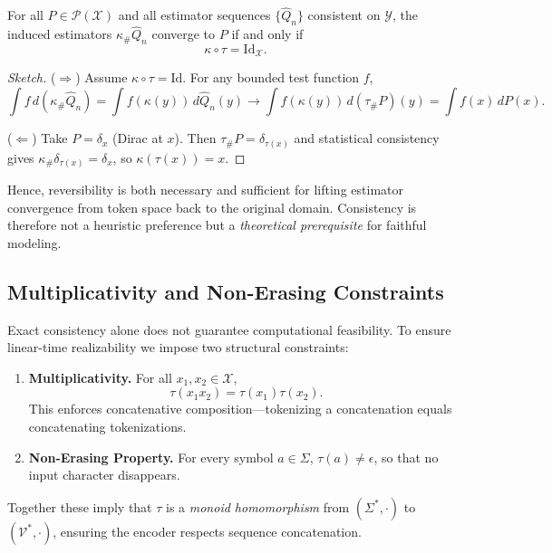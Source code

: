 \begin{theorem}
\label{thm:consistency}
For all $P\in\mathcal{P}(\mathcal{X})$ and all estimator sequences
$\{\hat Q_n\}$ consistent on $\mathcal{Y}$,
the induced estimators $\kappa_{\#}\hat Q_n$
converge to $P$ if and only if
\[
\kappa\!\circ\!\tau = \mathrm{Id}_{\mathcal{X}}.
\]
\end{theorem}

\begin{proof}[Sketch]
($\Rightarrow$)  
Assume $\kappa\!\circ\!\tau = \mathrm{Id}$.  
For any bounded test function $f$,
\[
\int f\,d(\kappa_{\#}\hat Q_n)
=\int f(\kappa(y))\,d\hat Q_n(y)
\to \int f(\kappa(y))\,d(\tau_{\#}P)(y)
= \int f(x)\,dP(x).
\]

($\Leftarrow$)  
Take $P=\delta_x$ (Dirac at $x$).
Then $\tau_{\#}P=\delta_{\tau(x)}$ and
statistical consistency gives
$\kappa_{\#}\delta_{\tau(x)}=\delta_x$,
so $\kappa(\tau(x))=x$.
\end{proof}

Hence, reversibility is both necessary and sufficient
for lifting estimator convergence from token space
back to the original domain.
Consistency is therefore not a heuristic preference
but a \emph{theoretical prerequisite} for faithful modeling.

\subsection{Multiplicativity and Non-Erasing Constraints}

Exact consistency alone does not guarantee computational feasibility.
To ensure linear-time realizability we impose two structural constraints:

\begin{enumerate}
\item \textbf{Multiplicativity.}
For all $x_1,x_2\in\mathcal{X}$,
\[
\tau(x_1x_2)=\tau(x_1)\tau(x_2).
\]
This enforces concatenative composition—tokenizing a
concatenation equals concatenating tokenizations.

\item \textbf{Non-Erasing Property.}
For every symbol $a\in\Sigma$, $\tau(a)\neq\epsilon$,
so that no input character disappears.
\end{enumerate}

Together these imply that $\tau$
is a \emph{monoid homomorphism} from
$(\Sigma^{*},\cdot)$ to $(\mathcal{V}^{*},\cdot)$,
ensuring the encoder respects sequence concatenation.

